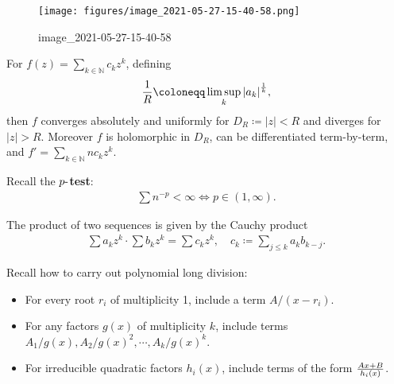 \begin{proposition}

\begin{figure}
\centering
\texttt{[image: figures/image\_2021-05-27-15-40-58.png]}
\caption{image\_2021-05-27-15-40-58}
\end{figure}

\end{proposition}

\begin{proposition}

For \(f(z) = \sum_{k\in {\mathbb{N}}} c_k z^k\), defining
\begin{align*}
{1\over R} \coloneqq\limsup_{k} {\left\lvert {a_k} \right\rvert}^{1\over k}
,\end{align*}
then \(f\) converges absolutely and uniformly for
\(D_R \coloneqq{\left\lvert {z} \right\rvert} < R\) and diverges for
\({\left\lvert {z} \right\rvert} > R\). Moreover \(f\) is holomorphic in
\(D_R\), can be differentiated term-by-term, and
\(f' = \sum_{k\in {\mathbb{N}}} n c_k z^k\).

\end{proposition}

\begin{fact}

Recall the \textbf{\(p{\hbox{-}}\)test}:
\begin{align*}
\sum n^{-p} < \infty \iff p \in (1, \infty)
.\end{align*}

\end{fact}

\begin{fact}

The product of two sequences is given by the Cauchy product
\begin{align*}
\sum a_kz^k \cdot \sum b_k z^k = \sum c_k z^k,\quad c_k \coloneqq\sum_{j\leq k} a_k b_{k-j}
.\end{align*}

\end{fact}

\begin{fact}

Recall how to carry out polynomial long division:


\end{fact}

\begin{fact}

\envlist

\begin{itemize}
\tightlist
\item
  For every root \(r_i\) of multiplicity 1, include a term
  \(A/(x-r_i)\).
\item
  For any factors \(g(x)\) of multiplicity \(k\), include terms
  \(A_1/g(x), A_2/g(x)^2, \cdots, A_k / g(x)^k\).
\item
  For irreducible quadratic factors \(h_i(x)\), include terms of the
  form \({Ax+B \over h_i(x)}\).
\end{itemize}

\end{fact}

